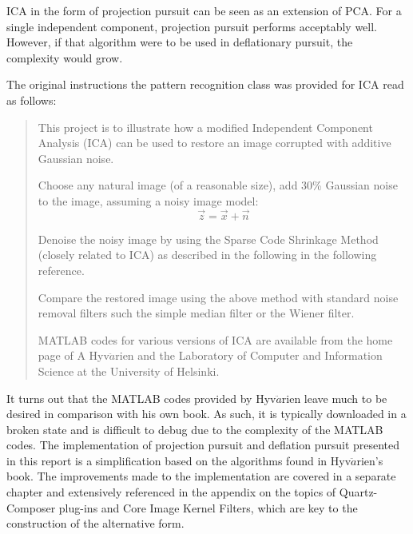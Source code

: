\documentclass[11pt]{article}
\begin{document}


ICA in the form of projection pursuit can be seen as an extension of PCA.  For a single independent component, projection pursuit performs acceptably well.  However, if that algorithm were to be used in deflationary pursuit, the complexity would grow.  

The original instructions the pattern recognition class was provided for ICA read as follows:

\begin{quote}
	This project is to illustrate how a modified Independent Component Analysis (ICA) can be used to restore an image corrupted with additive Gaussian noise.  

	Choose any natural image (of a reasonable size), add 30\% Gaussian noise to the image, assuming a noisy image model:
	\begin{equation}
	\vec{z} = \vec{x} + \vec{n}
	\end{equation}
	
	Denoise the noisy image by using the Sparse Code Shrinkage Method (closely related to ICA) as described in the following in the following reference. 
	
	Compare the restored image using the above method with standard noise removal filters such the simple median filter or the Wiener filter. 
	
	MATLAB codes for various versions of ICA are available from the home page of A Hyv$\ddot{a}$rien and the Laboratory of Computer and Information Science at the University of Helsinki. 
\end{quote}
It turns out that the MATLAB codes provided by Hyv$\ddot{a}$rien leave much to be desired in comparison with his own book.  As such, it is typically downloaded in a broken state and is difficult to debug due to the complexity of the MATLAB codes.  The implementation of projection pursuit and deflation pursuit presented in this report is a simplification based on the algorithms found in Hyv$\ddot{a}$rien's book.   The improvements made to the implementation are covered in a separate chapter and extensively referenced in the appendix on the topics of Quartz-Composer plug-ins and Core Image Kernel Filters, which are key to the construction of the alternative form.   
\end{document}
